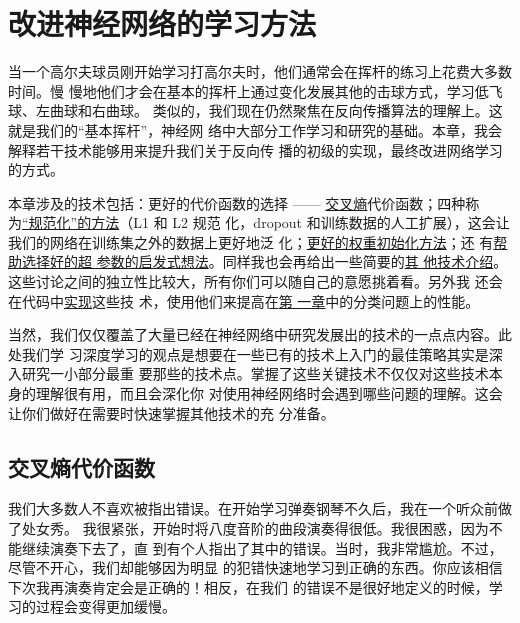 
\chapter{改进神经网络的学习方法}
\label{ch:ImprovingTheWayNeuralNetworksLearn}

当一个高尔夫球员刚开始学习打高尔夫时，他们通常会在挥杆的练习上花费大多数时间。慢
慢地他们才会在基本的挥杆上通过变化发展其他的击球方式，学习低飞球、左曲球和右曲球。
类似的，我们现在仍然聚焦在反向传播算法的理解上。这就是我们的``基本挥杆''，神经网
络中大部分工作学习和研究的基础。本章，我会解释若干技术能够用来提升我们关于反向传
播的初级的实现，最终改进网络学习的方式。

本章涉及的技术包括：更好的代价函数的选择 ——
\hyperref[sec:the_cross-entropy_cost_function]{交叉熵}代价函数；四种称
为\hyperref[sec:overfitting_and_regularization]{``规范化''的方法}（L1 和 L2 规范
化，dropout 和训练数据的人工扩展），这会让我们的网络在训练集之外的数据上更好地泛
化；\hyperref[sec:weight_initialization]{更好的权重初始化方法}；还
有\hyperref[sec:how_to_choose_a_neural_network's_hyper-parameters]{帮助选择好的超
  参数的启发式想法}。同样我也会再给出一些简要的\hyperref[sec:other_techniques]{其
  他技术介绍}。这些讨论之间的独立性比较大，所有你们可以随自己的意愿挑着看。另外我
还会在代码中\hyperref[sec:handwriting_recognition_revisited_the_code]{实现}这些技
术，使用他们来提高在\hyperref[ch:UsingNeuralNetsToRecognizeHandwrittenDigits]{第
  一章}中的分类问题上的性能。

当然，我们仅仅覆盖了大量已经在神经网络中研究发展出的技术的一点点内容。此处我们学
习深度学习的观点是想要在一些已有的技术上入门的最佳策略其实是深入研究一小部分最重
要那些的技术点。掌握了这些关键技术不仅仅对这些技术本身的理解很有用，而且会深化你
对使用神经网络时会遇到哪些问题的理解。这会让你们做好在需要时快速掌握其他技术的充
分准备。

\section{交叉熵代价函数}
\label{sec:the_cross-entropy_cost_function}

我们大多数人不喜欢被指出错误。在开始学习弹奏钢琴不久后，我在一个听众前做了处女秀。
我很紧张，开始时将八度音阶的曲段演奏得很低。我很困惑，因为不能继续演奏下去了，直
到有个人指出了其中的错误。当时，我非常尴尬。不过，尽管不开心，我们却能够因为明显
的犯错快速地学习到正确的东西。你应该相信下次我再演奏肯定会是正确的！相反，在我们
的错误不是很好地定义的时候，学习的过程会变得更加缓慢。

